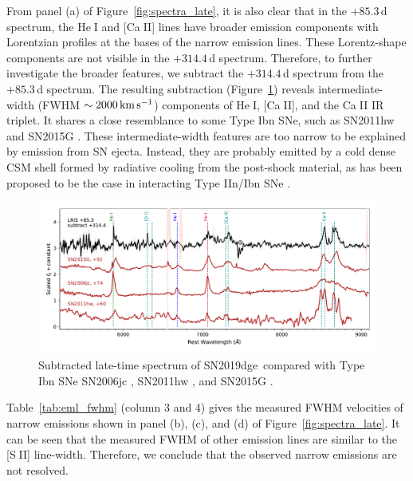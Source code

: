 \documentclass[twocolumn]{aastex63}
\newcommand{\name}{SN2019dge}
\def\ion#1#2{#1$\;${\footnotesize\rm{#2}}\relax}
\begin{document}
\begin{CJK*}{UTF8}{gbsn}
From panel (a) of Figure~\ref{fig:spectra_late}, it is also clear that in the $+85.3$\,d spectrum, the 
\ion{He}{I} and [\ion{Ca}{II}] lines have broader emission components with Lorentzian profiles at the 
bases of the narrow emission lines. These Lorentz-shape components are not visible in the 
$+314.4$\,d spectrum. Therefore, to further investigate the broader features, we subtract the 
$+314.4$\,d spectrum from the $+85.3$\,d spectrum. The resulting subtraction 
(Figure~\ref{fig:spec_subtract}) reveals intermediate-width (FWHM $\sim 2000\,{\rm km\,s^{-1}}$) 
components of \ion{He}{I}, [\ion{Ca}{II}], and the \ion{Ca}{II} IR triplet. It shares a close resemblance to 
some Type Ibn SNe, such as SN2011hw \citep{Pastorello2015} and SN2015G \citep{Shivvers2017}. 
These intermediate-width features are too narrow to be explained by emission from
SN ejecta. Instead, they are probably emitted by a cold dense CSM 
shell formed by radiative cooling from the post-shock material, as has been proposed to be the case in 
interacting Type IIn/Ibn SNe \citep{Chugai1994, Smith2017}. 

\begin{figure}
	\centering
	\includegraphics[width=\textwidth]{figures/spec_host_subtracted.pdf}
	\caption{Subtracted late-time spectrum of \name\ compared with Type Ibn SNe SN2006jc 
		\citep{Shivvers2019}, 
		SN2011hw \citep{Pastorello2015}, and SN2015G \citep{Shivvers2017}.
		\label{fig:spec_subtract}}
\end{figure}

Table~\ref{tab:eml_fwhm} (column 3 and 4) gives the measured FWHM velocities of narrow emissions 
shown in panel (b), (c), and (d) of Figure~\ref{fig:spectra_late}. It can 
be seen that the measured FWHM of other emission lines are similar to the [\ion{S}{II}] line-width. 
Therefore, we conclude that the observed narrow emissions are not resolved.


\end{CJK*}
\end{document}
